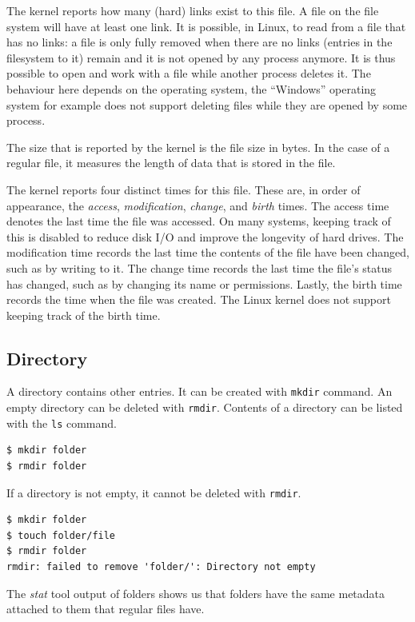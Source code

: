 \documentclass[a4paper]{article}
\begin{document}
The kernel reports how many (hard) links exist to this file. A file on the file system will have at least one link. It is possible, in Linux, to read from a file that has no links: a file is only fully removed when there are no links (entries in the filesystem to it) remain and it is not opened by any process anymore. It is thus possible to open and work with a file while another process deletes it. The behaviour here depends on the operating system, the “Windows” operating system for example does not support deleting files while they are opened by some process.

The size that is reported by the kernel is the file size in bytes. In the case of a regular file, it measures the length of data that is stored in the file.

The kernel reports four distinct times for this file. These are, in order of appearance, the \emph{access}, \emph{modification}, \emph{change}, and \emph{birth} times. The access time denotes the last time the file was accessed. On many systems, keeping track of this is disabled to reduce disk I/O and improve the longevity of hard drives. The modification time records the last time the contents of the file have been changed, such as by writing to it. The change time records the last time the file's status has changed, such as by changing its name or permissions. Lastly, the birth time records the time when the file was created. The Linux kernel does not support keeping track of the birth time.



\subsection{Directory}

A directory contains other entries. It can be created with \verb|mkdir| command. An empty directory can be deleted with \verb|rmdir|. Contents of a directory can be listed with the \verb|ls| command.

\begin{verbatim}
$ mkdir folder
$ rmdir folder  
\end{verbatim}
If a directory is not empty, it cannot be deleted with \verb|rmdir|.

\begin{verbatim}
$ mkdir folder
$ touch folder/file
$ rmdir folder
rmdir: failed to remove 'folder/': Directory not empty
\end{verbatim}
The \emph{stat} tool output of folders shows us that folders have the same metadata attached to them that regular files have.
\end{document}
